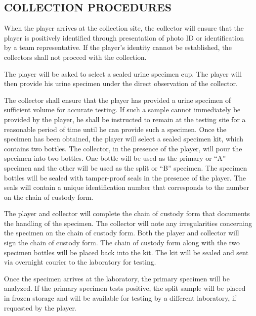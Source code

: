 \documentclass[
]{book}
\begin{document}
\hypertarget{collection-procedures}{%
\section{COLLECTION PROCEDURES}\label{collection-procedures}}

When the player arrives at the collection site, the collector will ensure that the player is positively identified through presentation of photo ID or identification by a team representative. If the player's identity cannot be established, the collectors shall not proceed with the collection.

The player will be asked to select a sealed urine specimen cup. The player will then provide his urine specimen under the direct observation of the collector.

The collector shall ensure that the player has provided a urine specimen of sufficient volume for accurate testing. If such a sample cannot immediately be provided by the player, he shall be instructed to remain at the testing site for a reasonable period of time until he can provide such a specimen. Once the specimen has been obtained, the player will select a sealed specimen kit, which contains two bottles. The collector, in the presence of the player, will pour the specimen into two bottles. One bottle will be used as the primary or ``A'' specimen and the other will be used as the split or ``B'' specimen. The specimen bottles will be sealed with tamper-proof seals in the presence of the player. The seals will contain a unique identification number that corresponds to the number on the chain of custody form.

The player and collector will complete the chain of custody form that documents the handling of the specimen. The collector will note any irregularities concerning the specimen on the chain of custody form. Both the player and collector will sign the chain of custody form. The chain of custody form along with the two specimen bottles will be placed back into the kit. The kit will be sealed and sent via overnight courier to the laboratory for testing.

Once the specimen arrives at the laboratory, the primary specimen will be analyzed. If the primary specimen tests positive, the split sample will be placed in frozen storage and will be available for testing by a different laboratory, if requested by the player.

\hypertarget{section-2}{%
\chapter{}\label{section-2}}
\end{document}
